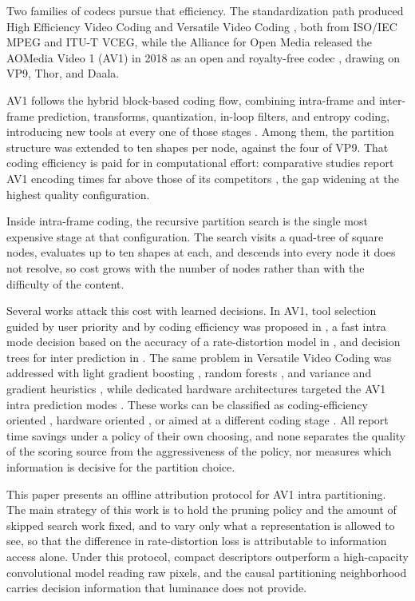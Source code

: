 \documentclass{article}
\begin{document}
Two families of codecs pursue that efficiency. The standardization path produced
High Efficiency Video Coding \cite{hevc} and Versatile Video Coding \cite{vvc},
both from ISO/IEC MPEG and ITU-T VCEG, while the Alliance for Open Media released
the AOMedia Video 1 (AV1) in 2018 as an open and royalty-free codec
\cite{av1site}, drawing on VP9, Thor, and Daala.

AV1 follows the hybrid block-based coding flow, combining intra-frame and
inter-frame prediction, transforms, quantization, in-loop filters, and entropy
coding, introducing new tools at every one of those stages
\cite{han2021,chen2018}. Among them, the partition structure was extended to ten
shapes per node, against the four of VP9. That coding efficiency is paid for in
computational effort: comparative studies report AV1 encoding times far above
those of its competitors \cite{grois2016,layek2017}, the gap widening at the
highest quality configuration.

Inside intra-frame coding, the recursive partition search is the single most
expensive stage at that configuration. The search visits a quad-tree of square
nodes, evaluates up to ten shapes at each, and descends into every node it does
not resolve, so cost grows with the number of nodes rather than with the
difficulty of the content.

Several works attack this cost with learned decisions. In AV1, tool selection
guided by user priority and by coding efficiency was proposed in
\cite{xu2020,xu2021}, a fast intra mode decision based on the accuracy of a
rate-distortion model in \cite{jeong2019}, and decision trees for inter prediction
in \cite{kim2019}. The same problem in Versatile Video Coding was addressed with
light gradient boosting \cite{saldanha2022}, random forests \cite{he2021}, and
variance and gradient heuristics \cite{chen2019}, while dedicated hardware
architectures targeted the AV1 intra prediction modes \cite{correa2020,netto2022}.
These works can be classified as coding-efficiency oriented
\cite{jeong2019,xu2021,saldanha2022,he2021,chen2019}, hardware oriented
\cite{correa2020,netto2022}, or aimed at a different coding stage
\cite{xu2020,kim2019}. All report time savings under a policy of their own
choosing, and none separates the quality of the scoring source from the
aggressiveness of the policy, nor measures which information is decisive for the
partition choice.

This paper presents an offline attribution protocol for AV1 intra partitioning.
The main strategy of this work is to hold the pruning policy and the amount of
skipped search work fixed, and to vary only what a representation is allowed to
see, so that the difference in rate-distortion loss is attributable to
information access alone. Under this protocol, compact descriptors outperform a
high-capacity convolutional model reading raw pixels, and the causal
partitioning neighborhood carries decision information that luminance does not
provide.
\end{document}

